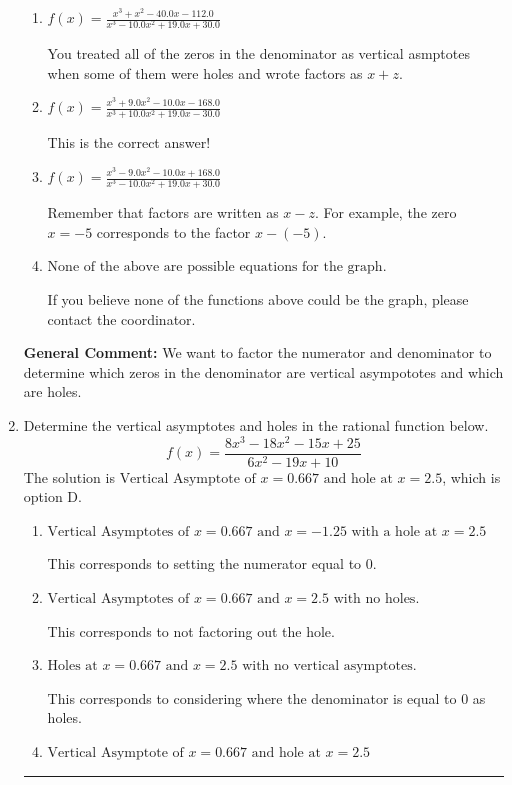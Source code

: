 \documentclass{extbook}[14pt]
\newcommand{\litem}[1]{\item #1

\rule{\textwidth}{0.4pt}}
\begin{document}
\begin{enumerate}
{\begin{enumerate}[label=\Alph*.]
You treated all of the zeros in the denominator as vertical asymptotes when some of them were holes!
\item \( f(x)=\frac{x^{3} + x^{2} -40.0 x -112.0}{x^{3} -10.0 x^{2} +19.0 x + 30.0} \)

You treated all of the zeros in the denominator as vertical asmptotes when some of them were holes and wrote factors as $x+z$.
\item \( f(x)=\frac{x^{3} +9.0 x^{2} -10.0 x -168.0}{x^{3} +10.0 x^{2} +19.0 x -30.0} \)

This is the correct answer!
\item \( f(x)=\frac{x^{3} -9.0 x^{2} -10.0 x + 168.0}{x^{3} -10.0 x^{2} +19.0 x + 30.0} \)

Remember that factors are written as $x-z$. For example, the zero $x=-5$ corresponds to the factor $x-(-5)$.
\item \( \text{None of the above are possible equations for the graph.} \)

If you believe none of the functions above could be the graph, please contact the coordinator.
\end{enumerate}

\textbf{General Comment:} We want to factor the numerator and denominator to determine which zeros in the denominator are vertical asympototes and which are holes.
}
\litem{
Determine the vertical asymptotes and holes in the rational function below.
\[ f(x) = \frac{8x^{3} -18 x^{2} -15 x + 25}{6x^{2} -19 x + 10} \]The solution is \( \text{Vertical Asymptote of } x = 0.667 \text{ and hole at } x = 2.5 \), which is option D.\begin{enumerate}[label=\Alph*.]
\item \( \text{Vertical Asymptotes of } x = 0.667 \text{ and } x = -1.25 \text{ with a hole at } x = 2.5 \)

This corresponds to setting the numerator equal to 0.
\item \( \text{Vertical Asymptotes of } x = 0.667 \text{ and } x = 2.5 \text{ with no holes.} \)

This corresponds to not factoring out the hole.
\item \( \text{Holes at } x = 0.667 \text{ and } x = 2.5 \text{ with no vertical asymptotes.} \)

This corresponds to considering where the denominator is equal to 0 as holes.
\item \( \text{Vertical Asymptote of } x = 0.667 \text{ and hole at } x = 2.5 \)


\end{enumerate}}
\end{enumerate}
\end{document}
